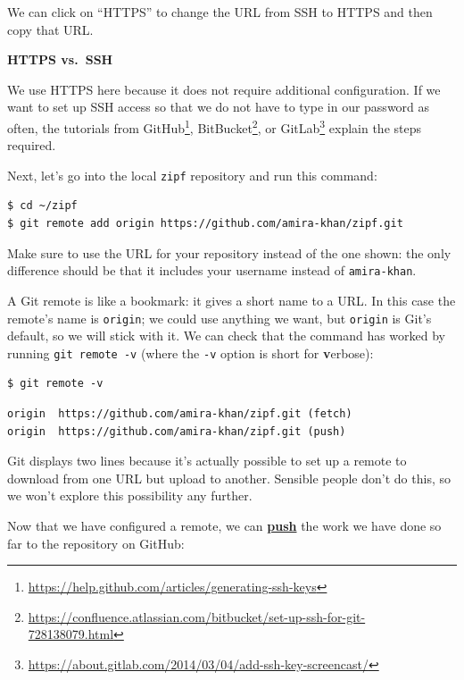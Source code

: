\documentclass[
]{krantz}
\renewenvironment{quote}{\begin{VF}}{\end{VF}}
\renewcommand{\href}[2]{#2\footnote{\url{#1}}}
\newcommand{\gref}[2]{\hyperlink{#2}{\textbf{#1}}}
\begin{document}
We can click on ``HTTPS'' to change the URL from SSH to HTTPS
and then copy that URL.

\begin{quote}
\textbf{HTTPS vs.~SSH}

We use HTTPS here because it does not require additional configuration.
If we want to set up SSH access so that we do not have to type in our password as often,
the tutorials from \href{https://help.github.com/articles/generating-ssh-keys}{GitHub},
\href{https://confluence.atlassian.com/bitbucket/set-up-ssh-for-git-728138079.html}{BitBucket},
or \href{https://about.gitlab.com/2014/03/04/add-ssh-key-screencast/}{GitLab}
explain the steps required.
\end{quote}

Next,
let's go into the local \texttt{zipf} repository and run this command:

\begin{verbatim}
$ cd ~/zipf
$ git remote add origin https://github.com/amira-khan/zipf.git
\end{verbatim}

Make sure to use the URL for your repository instead of the one shown:
the only difference should be that it includes your username instead of \texttt{amira-khan}.

A Git remote is like a bookmark:
it gives a short name to a URL.
In this case the remote's name is \texttt{origin};
we could use anything we want,
but \texttt{origin} is Git's default,
so we will stick with it.
We can check that the command has worked by running \texttt{git\ remote\ -v}
(where the \texttt{-v} option is short for \textbf{v}erbose):

\begin{verbatim}
$ git remote -v
\end{verbatim}

\begin{verbatim}
origin  https://github.com/amira-khan/zipf.git (fetch)
origin  https://github.com/amira-khan/zipf.git (push)
\end{verbatim}

Git displays two lines because it's actually possible to set up a remote
to download from one URL but upload to another.
Sensible people don't do this,
so we won't explore this possibility any further.

Now that we have configured a remote,
we can \gref{push}{git\_push} the work we have done so far
to the repository on GitHub:
\end{document}
